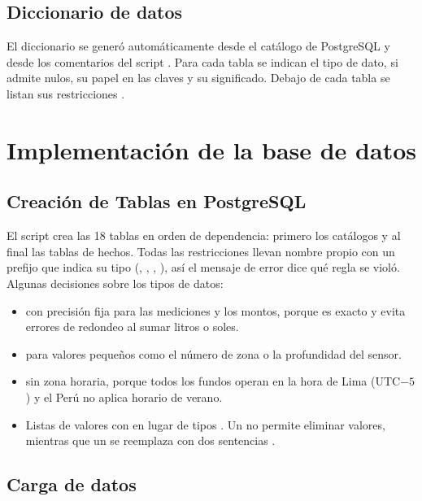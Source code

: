 \subsection{Diccionario de datos}

El diccionario se generó automáticamente desde el catálogo de PostgreSQL y desde los comentarios del script . Para cada tabla se indican el tipo de dato, si admite nulos, su papel en las claves y su significado. Debajo de cada tabla se listan sus restricciones .


\section{Implementación de la base de datos}

\subsection{Creación de Tablas en PostgreSQL}

El script  crea las 18 tablas en orden de dependencia: primero los catálogos y al final las tablas de hechos. Todas las restricciones llevan nombre propio con un prefijo que indica su tipo (, , , ), así el mensaje de error dice qué regla se violó. Algunas decisiones sobre los tipos de datos:

\begin{itemize}[leftmargin=1.4em,itemsep=0.1em]
\item {} con precisión fija para las mediciones y los montos, porque es exacto y evita errores de redondeo al sumar litros o soles.
\item {} para valores pequeños como el número de zona o la profundidad del sensor.
\item {} sin zona horaria, porque todos los fundos operan en la hora de Lima (UTC$-5$) y el Perú no aplica horario de verano.
\item Listas de valores con  en lugar de tipos . Un  no permite eliminar valores, mientras que un  se reemplaza con dos sentencias .
\end{itemize}


\subsection{Carga de datos}

